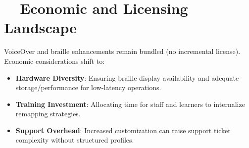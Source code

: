 \section{~~Economic and Licensing Landscape}
\label{sec:sr30-economics}
VoiceOver and braille enhancements remain bundled (no incremental license). Economic considerations shift to:
\begin{itemize}
	\item \textbf{Hardware Diversity}: Ensuring braille display availability and adequate storage/performance for low-latency operations.
	\item \textbf{Training Investment}: Allocating time for staff and learners to internalize remapping strategies.
	\item \textbf{Support Overhead}: Increased customization can raise support ticket complexity without structured profiles.
\end{itemize}

